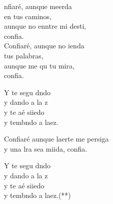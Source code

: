 \documentclass[12pt]{article}
\begin{document}
\begin{multicols*}{2}
\begin{cancion}[Confiaré][]%
	nfiaré, aunque meerda \\
en tus caminos,\\
	aunque no enntre mi desti, \\
	confia. \\
	Confiaré, aunque no ienda \\
tus palabras,\\
	aunque me qu tu mira, \\
	confia. \\
	\begin{chorus}%
	Y te segu dndo  \\
	y dando a la z\\
	y te aé siiedo \\
	y tembndo a laez.\\
	\end{chorus}%
	Confiaré aunque laerte me persiga\\
	y una lra sea miida, confia. \\
	\begin{chorus}%
	Y te segu dndo  \\
	y dando a la z\\
	y te aé siiedo \\
	y tembndo a laez.(**)\\
	\end{chorus}%
\end{cancion}%


\end{multicols*}
\end{document}
